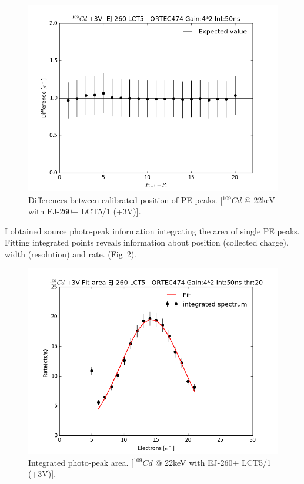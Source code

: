 \documentclass[10pt,a4paper, openany]{book}
\begin{document}
\begin{figure}[!h]
\begin{center}
\includegraphics[scale=0.39]{imm/diff.png}
\end{center}
\caption{Differences between calibrated position of PE peaks. [$^{109}Cd$ @ 22keV with EJ-260+ LCT5/1 (+3V)].} 
\label{fig:diff}
\end{figure}

I obtained source photo-peak information integrating the area of single PE peaks. Fitting integrated points reveals information about position (collected charge), width (resolution) and rate. (Fig~\ref{fig:peak}). 

\begin{figure}[!h]
\begin{center}
\includegraphics[scale=0.4]{imm/area.png}
\end{center}
\caption{Integrated photo-peak area. [$^{109}Cd$ @ 22keV with EJ-260+ LCT5/1 (+3V)].} 
\label{fig:peak}
\end{figure}
\end{document}

